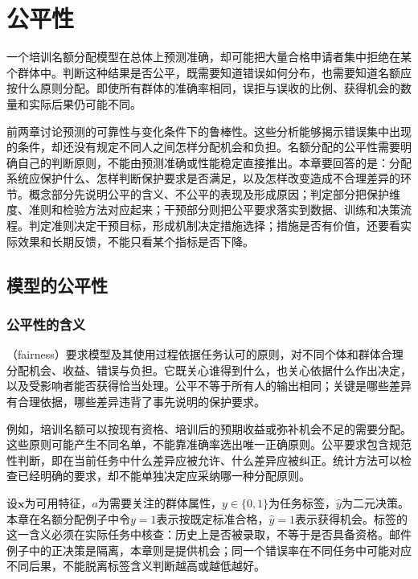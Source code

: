 \chapter{公平性}
\label{chap:trust-fairness}

一个培训名额分配模型在总体上预测准确，却可能把大量合格申请者集中拒绝在某个群体中。判断这种结果是否公平，既需要知道错误如何分布，也需要知道名额应按什么原则分配。即使所有群体的准确率相同，误拒与误收的比例、获得机会的数量和实际后果仍可能不同。

前两章讨论预测的可靠性与变化条件下的鲁棒性。这些分析能够揭示错误集中出现的条件，却还没有规定不同人之间怎样分配机会和负担。名额分配的公平性需要明确自己的判断原则，不能由预测准确或性能稳定直接推出。本章要回答的是：分配系统应保护什么、怎样判断保护要求是否满足，以及怎样改变造成不合理差异的环节。概念部分先说明公平的含义、不公平的表现及形成原因；判定部分把保护维度、准则和检验方法对应起来；干预部分则把公平要求落实到数据、训练和决策流程。判定准则决定干预目标，形成机制决定措施选择；措施是否有价值，还要看实际效果和长期反馈，不能只看某个指标是否下降。

\section{模型的公平性}
\label{sec:fairness-concepts}

\subsection{公平性的含义}
\label{sec:fairness-meaning}

（fairness）要求模型及其使用过程依据任务认可的原则，对不同个体和群体合理分配机会、收益、错误与负担。它既关心谁得到什么，也关心依据什么作出决定，以及受影响者能否获得恰当处理。公平不等于所有人的输出相同；关键是哪些差异有合理依据，哪些差异违背了事先说明的保护要求。

例如，培训名额可以按现有资格、培训后的预期收益或弥补机会不足的需要分配。这些原则可能产生不同名单，不能靠准确率选出唯一正确原则。公平要求包含规范性判断，即在当前任务中什么差异应被允许、什么差异应被纠正。统计方法可以检查已经明确的要求，却不能单独决定应采纳哪一种分配原则。

设$\bm{x}$为可用特征，$a$为需要关注的群体属性，$y\in\{0,1\}$为任务标签，$\hat y$为二元决策。本章在名额分配例子中令$y=1$表示按既定标准合格，$\hat y=1$表示获得机会。标签的这一含义必须在实际任务中核查：历史上是否被录取，不等于是否具备资格。邮件例子中的正决策是隔离，本章则是提供机会；同一个错误率在不同任务中可能对应不同后果，不能脱离标签含义判断越高或越低越好。

